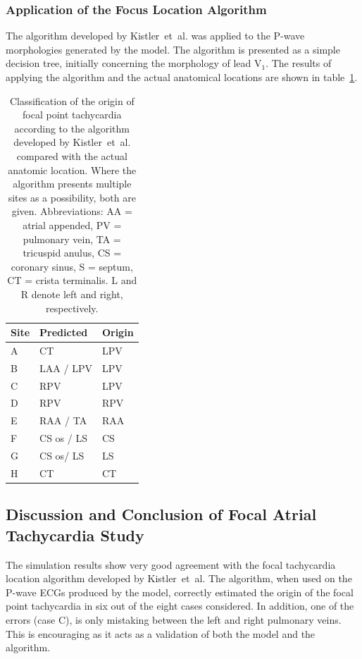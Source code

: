 \subsubsection{Application of the Focus Location Algorithm}

The algorithm developed by Kistler~et~al. was applied to the P-wave morphologies
generated by the model.
The algorithm is presented as a simple decision tree, initially concerning the
morphology of lead $\text{V}_{\text{1}}$.
The results of applying the algorithm and the actual anatomical locations are
shown in table~\ref{tbl:forward:fat:kistler}.


\begin{table}
\caption[Classification of focal point tachycardia]{
\label{tbl:forward:fat:kistler}
Classification of the origin of focal point tachycardia according to the
algorithm developed by Kistler~et~al. compared with the actual anatomic
location.
Where the algorithm presents multiple sites as a possibility, both are given.
Abbreviations: AA = atrial appended, PV = pulmonary vein, TA = tricuspid anulus,
CS = coronary sinus, S = septum, CT = crista terminalis.
L and R denote left and right, respectively.
}
\begin{center}
\begin{tabular}{l l l}
\toprule
Site & Predicted  & Origin \\
\midrule
A & CT & LPV \\
B & LAA / LPV & LPV \\
C & RPV & LPV \\
D & RPV & RPV \\
E & RAA / TA & RAA \\
F & CS os / LS & CS \\
G & CS os/ LS & LS \\
H & CT & CT \\
\bottomrule
\end{tabular}
\end{center}
\end{table}

\subsection{Discussion and Conclusion of Focal Atrial Tachycardia Study}

The simulation results show very good agreement with the focal tachycardia
location algorithm developed by Kistler~et~al.
The algorithm, when used on the P-wave ECGs produced by the model, correctly
estimated the origin of the focal point tachycardia in six out of the eight
cases considered.
In addition, one of the errors (case C), is only mistaking between the left and
right pulmonary veins.
This is encouraging as it acts as a validation of both the model and the
algorithm.

